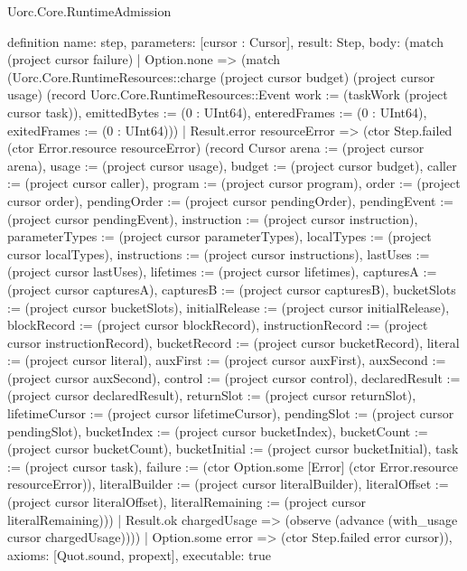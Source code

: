 \begin{lexlean}{Uorc.Core.RuntimeAdmission}
\begin{semanticmodule}
definition{
  name: step,
  parameters: [cursor : Cursor],
  result: Step,
  body: (match (project cursor failure)
    | Option.none => (match (Uorc.Core.RuntimeResources::charge (project cursor budget) (project cursor usage) (record Uorc.Core.RuntimeResources::Event {work := (taskWork (project cursor task)), emittedBytes := (0 : UInt64), enteredFrames := (0 : UInt64), exitedFrames := (0 : UInt64)}))
      | Result.error resourceError => (ctor Step.failed (ctor Error.resource resourceError) (record Cursor {arena := (project cursor arena), usage := (project cursor usage), budget := (project cursor budget), caller := (project cursor caller), program := (project cursor program), order := (project cursor order), pendingOrder := (project cursor pendingOrder), pendingEvent := (project cursor pendingEvent), instruction := (project cursor instruction), parameterTypes := (project cursor parameterTypes), localTypes := (project cursor localTypes), instructions := (project cursor instructions), lastUses := (project cursor lastUses), lifetimes := (project cursor lifetimes), capturesA := (project cursor capturesA), capturesB := (project cursor capturesB), bucketSlots := (project cursor bucketSlots), initialRelease := (project cursor initialRelease), blockRecord := (project cursor blockRecord), instructionRecord := (project cursor instructionRecord), bucketRecord := (project cursor bucketRecord), literal := (project cursor literal), auxFirst := (project cursor auxFirst), auxSecond := (project cursor auxSecond), control := (project cursor control), declaredResult := (project cursor declaredResult), returnSlot := (project cursor returnSlot), lifetimeCursor := (project cursor lifetimeCursor), pendingSlot := (project cursor pendingSlot), bucketIndex := (project cursor bucketIndex), bucketCount := (project cursor bucketCount), bucketInitial := (project cursor bucketInitial), task := (project cursor task), failure := (ctor Option.some [Error] (ctor Error.resource resourceError)), literalBuilder := (project cursor literalBuilder), literalOffset := (project cursor literalOffset), literalRemaining := (project cursor literalRemaining)}))
      | Result.ok chargedUsage => (observe (advance (with_usage cursor chargedUsage))))
    | Option.some error => (ctor Step.failed error cursor)),
  axioms: [Quot.sound, propext],
  executable: true
}


\end{semanticmodule}
\end{lexlean}
